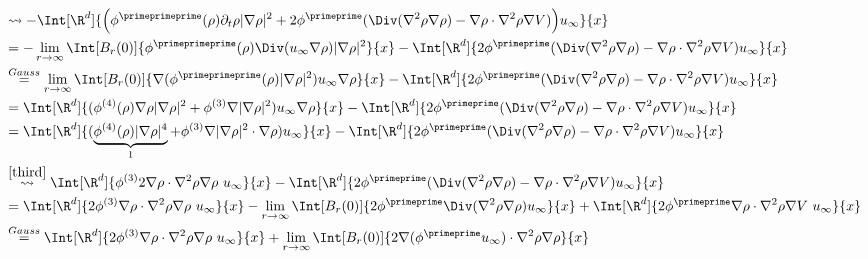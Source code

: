 \begin{solution}
\begin{enumerate}[label = (\roman*)]
  \begin{align*}
    &\rightsquigarrow
    -\Int[\R^d]{
    \Big(\phi^\primeprimeprime(\rho)
    \partial_t\rho
    |\nabla \rho|^2
    +
    2 \phi^\primeprime(
    \Div(\nabla^2 \rho \nabla \rho)
    -
    \nabla \rho \cdot \nabla^2 \rho \nabla V)\Big)u_\infty}{x} \\
    &=
    - \lim_{r \rightarrow \infty}
    \Int[B_r(0)]{
    \phi^\primeprimeprime(\rho) \Div(u_\infty \nabla \rho) |\nabla \rho|^2
    }{x}
    -
    \Int[\R^d]{2 \phi^\primeprime(
    \Div(\nabla^2 \rho \nabla \rho)
    -
    \nabla \rho \cdot \nabla^2 \rho \nabla V)u_\infty}{x} \\
    &\stackrel{Gauss}{=}
    \lim_{r \rightarrow \infty}
    \Int[B_r(0)]{
    \nabla (\phi^\primeprimeprime(\rho)|\nabla \rho|^2) u_\infty \nabla \rho
    }{x}
    -
    \Int[\R^d]{2 \phi^\primeprime(
    \Div(\nabla^2 \rho \nabla \rho)
    -
    \nabla \rho \cdot \nabla^2 \rho \nabla V)u_\infty}{x} \\
    &=
    \Int[\R^d]{
    (\phi^{(4)}(\rho)\nabla \rho |\nabla \rho|^2+ \phi^{(3)}\nabla |\nabla \rho|^2) u_\infty \nabla \rho
    }{x}
    -
    \Int[\R^d]{2 \phi^\primeprime(
    \Div(\nabla^2 \rho \nabla \rho)
    -
    \nabla \rho \cdot \nabla^2 \rho \nabla V)u_\infty}{x} \\
    &=
    \Int[\R^d]{
    (\underbrace{\phi^{(4)}(\rho)|\nabla \rho|^4}_{1} + \phi^{(3)}\nabla |\nabla \rho|^2 \cdot \nabla \rho) u_\infty
    }{x}
    -
    \Int[\R^d]{2 \phi^\primeprime(
    \Div(\nabla^2 \rho \nabla \rho)
    -
    \nabla \rho \cdot \nabla^2 \rho \nabla V)u_\infty}{x} \\
    &\stackrel{\ref{third}}{\rightsquigarrow}
    \Int[\R^d]{
    \phi^{(3)}2\nabla \rho \cdot \nabla^2 \rho \nabla \rho~ u_\infty
    }{x}
    -
    \Int[\R^d]{2 \phi^\primeprime(
    \Div(\nabla^2 \rho \nabla \rho)
    -
    \nabla \rho \cdot \nabla^2 \rho \nabla V)u_\infty}{x} \\
    &=
    \Int[\R^d]{
    2\phi^{(3)}\nabla \rho \cdot \nabla^2 \rho \nabla \rho~ u_\infty
    }{x}
    -
    \lim_{r \rightarrow \infty}
    \Int[B_r(0)]{2 \phi^\primeprime
    \Div(\nabla^2 \rho \nabla \rho) u_\infty}{x}
    +
    \Int[\R^d]{2\phi^\primeprime \nabla \rho \cdot \nabla^2 \rho \nabla V~u_\infty}{x} \\
    &\stackrel{Gauss}{=}
    \Int[\R^d]{
    2\phi^{(3)}\nabla \rho \cdot \nabla^2 \rho \nabla \rho~ u_\infty
    }{x}
    +
    \lim_{r \rightarrow \infty}
    \Int[B_r(0)]{2 \nabla (\phi^\primeprime u_\infty) \cdot
    \nabla^2 \rho \nabla \rho }{x}

\end{align*}
\end{enumerate}
\end{solution}
